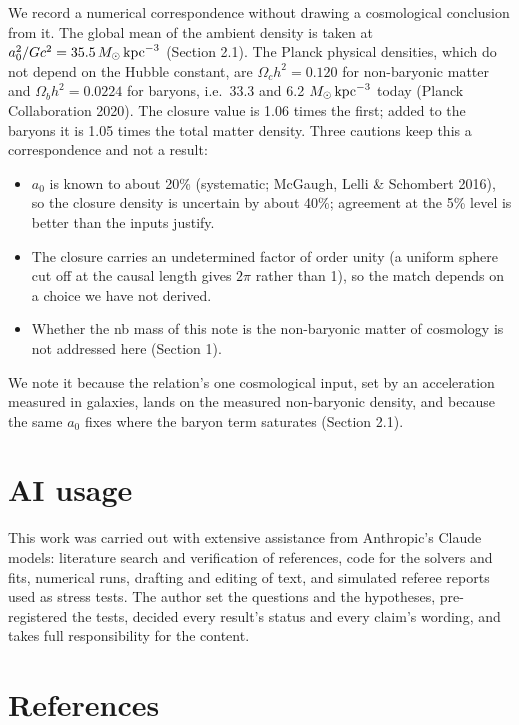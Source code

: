 \documentclass[
  10pt,
]{article}
\begin{document}
We record a numerical correspondence without drawing a cosmological
conclusion from it. The global mean of the ambient density is taken at
$a_0^2/Gc^2=35.5\,M_\odot\,{\rm kpc}^{-3}$ (Section 2.1). The Planck
physical densities, which do not depend on the Hubble constant, are
$\Omega_ch^2=0.120$ for non-baryonic matter and $\Omega_bh^2=0.0224$ for
baryons, i.e.\ 33.3 and 6.2 $M_\odot\,{\rm kpc}^{-3}$ today (Planck
Collaboration 2020). The closure value is 1.06 times the first; added to
the baryons it is 1.05 times the total matter density. Three cautions keep
this a correspondence and not a result:
\begin{itemize}
\item[(i)] $a_0$ is known to about 20\% (systematic; McGaugh, Lelli \& Schombert 2016), so the closure density is uncertain by about 40\%; agreement at the 5\% level is better than the inputs justify.
\item[(ii)] The closure carries an undetermined factor of order unity (a uniform sphere cut off at the causal length gives $2\pi$ rather than 1), so the match depends on a choice we have not derived.
\item[(iii)] Whether the nb mass of this note is the non-baryonic matter of cosmology is not addressed here (Section 1).
\end{itemize}
We note it because the relation's one cosmological input, set by an acceleration measured in galaxies, lands on the measured non-baryonic density, and because the same $a_0$ fixes where the baryon term saturates (Section 2.1).

\section{AI usage}\label{ai-usage}

This work was carried out with extensive assistance from Anthropic's
Claude models: literature search and verification of references, code
for the solvers and fits, numerical runs, drafting and editing of text,
and simulated referee reports used as stress tests. The author set the
questions and the hypotheses, pre-registered the tests, decided every
result's status and every claim's wording, and takes full responsibility
for the content.

\section{References}\label{references}
\end{document}
